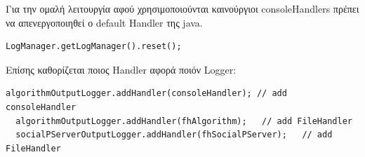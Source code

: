 Για την ομαλή λειτουργία αφού χρησιμοποιούνται καινούργιοι consoleHandlers πρέπει να απενεργοποιηθεί ο default Handler της java.
\begin{lstlisting}[frame=single] 
  LogManager.getLogManager().reset();
\end{lstlisting}

  
Επίσης καθορίζεται ποιος Handler αφορά ποιόν Logger:
\begin{lstlisting}[frame=single] 
  algorithmOutputLogger.addHandler(consoleHandler); // add consoleHandler
  algorithmOutputLogger.addHandler(fhAlgorithm);   // add FileHandler
  socialPServerOutputLogger.addHandler(fhSocialPServer);   // add FileHandler
\end{lstlisting}

